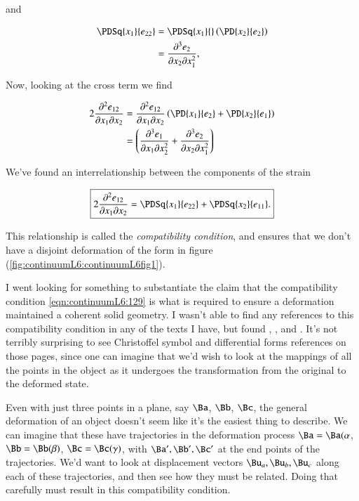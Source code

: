 and

\begin{align*}
\PDSq{x_1}{e_{22}} 
&= 
\PDSq{x_1}{}\left( 
\PD{x_2}{e_2}
\right) \\
&= 
\frac{\partial^3 e_2}{\partial x_2 \partial x_1^2},
\end{align*}

Now, looking at the cross term we find

\begin{align*}
2 \frac{\partial^2 e_{12}}{\partial x_1 \partial x_2} 
&= 
\frac{\partial^2 e_{12}}{\partial x_1 \partial x_2} 
\left(
\PD{x_1}{e_2}
+ \PD{x_2}{e_1} 
\right) \\
&=
\left(
\frac{\partial^3 e_1}{\partial x_1 \partial x_2^2} 
+
\frac{\partial^3 e_2}{\partial x_2 \partial x_1^2} 
\right)
\end{align*}

We've found an interrelationship between the components of the strain

\begin{equation}\label{eqn:continuumL6:129}
\boxed{
2 \frac{\partial^2 e_{12}}{\partial x_1 \partial x_2} 
=
\PDSq{x_1}{e_{22}} 
+\PDSq{x_2}{e_{11}}.
}
\end{equation}

This relationship is called the \textit{compatibility condition}, and ensures that we don't have a disjoint deformation of the form in figure (\ref{fig:continuumL6:continuumL6fig1}).


I went looking for something to substantiate the claim that the compatibility condition \ref{eqn:continuumL6:129} is what is required to ensure a deformation maintained a coherent solid geometry.  I wasn't able to find any references to this compatibility condition in any of the texts I have, but found \cite{wiki:compatibilityMechanics}, \cite{wiki:infinitesimalStrainTheory}, and \cite{wiki:saintVenantCompat}.  It's not terribly surprising to see Christoffel symbol and differential forms references on those pages, since one can imagine that we'd wish to look at the mappings of all the points in the object as it undergoes the transformation from the original to the deformed state.

Even with just three points in a plane, say $\Ba$, $\Bb$, $\Bc$, the general deformation of an object doesn't seem like it's the easiest thing to describe.  We can imagine that these have trajectories in the deformation process $\Ba = \Ba(\alpha$, $\Bb = \Bb(\beta)$, $\Bc = \Bc(\gamma)$, with $\Ba', \Bb', \Bc'$ at the end points of the trajectories.  We'd want to look at displacement vectors $\Bu_a, \Bu_b, \Bu_c$ along each of these trajectories, and then see how they must be related.  Doing that carefully must result in this compatibility condition.

